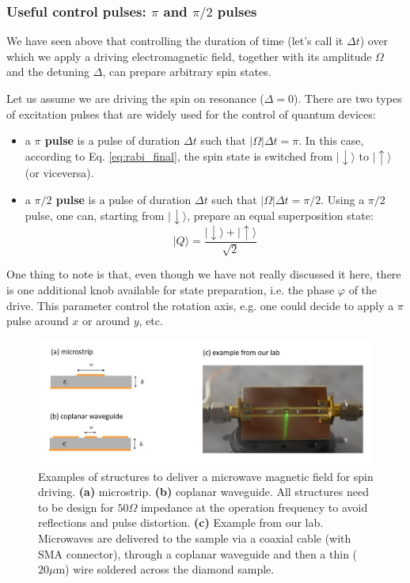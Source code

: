 \documentclass[a4paper,11pt]{article}
\newcommand{\ket}[1]{| #1 \rangle}
\begin{document}
\subsubsection{Useful control pulses: $\pi$ and $\pi/2$ pulses}
We have seen above that controlling the duration of time (let's call it $\Delta t$) over which we apply a driving electromagnetic field, together with its amplitude $\Omega$ and the detuning $\Delta$, can prepare arbitrary spin states.

Let us assume we are driving the spin on resonance ($\Delta = 0$). There are two types of excitation pulses that are widely used for the control of quantum devices:
\begin{itemize}
    \item a {\bf $\pi$ pulse} is a pulse of duration $\Delta t$ such that $|\Omega| \Delta t = \pi$. In this case, according to Eq. \ref{eq:rabi_final}, the spin state is switched from $\ket{\downarrow}$ to $\ket{\uparrow}$ (or viceversa).
    \item a {\bf $\pi/2$ pulse} is a pulse of duration $\Delta t$ such that $|\Omega| \Delta t = \pi/2$. Using a $\pi/2$ pulse, one can, starting from $\ket{\downarrow}$, prepare an equal superposition state:
    \begin{equation}
        \ket{Q} = \frac{\ket{\downarrow} + \ket{\uparrow}}{\sqrt{2}}
    \end{equation}
\end{itemize}

One thing to note is that, even though we have not really discussed it here, there is one additional knob available for state preparation, i.e. the phase $\varphi$ of the drive. This parameter control the rotation axis, e.g. one could decide to apply a $\pi$ pulse around $x$ or around $y$, etc.


\begin{figure}[h]
\centering
\includegraphics[width = 1\textwidth]{figures/microwaves.png}
\caption{Examples of structures to deliver a microwave magnetic field for spin driving. {\bf (a)} microstrip. {\bf (b)} coplanar waveguide. All structures need to be design for $50 \Omega$ impedance at the operation frequency to avoid reflections and pulse distortion. {\bf (c)} Example from our lab. Microwaves are delivered to the sample via a coaxial cable (with SMA connector), through a coplanar waveguide and then a thin ($20 \mu$m) wire soldered across the diamond sample.}
\label{fig:MW}
\end{figure}
\end{document}
